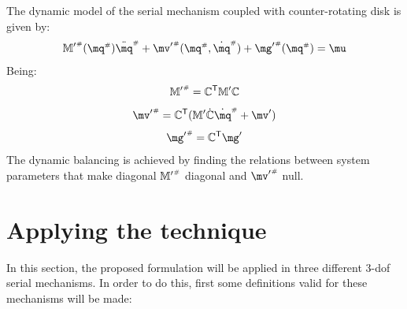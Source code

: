 \documentclass[a4paper,11pt,brazil,fleqn]{article}
\begin{document}
The dynamic model of the serial mechanism coupled with counter-rotating disk is given by:
\begin{equation}\label{eq:CoupledDynamics}
{\mM'}\ssh (\mq\ssh) \ddot{\mq}\ssh + {\mv'}\ssh(\mq\ssh,\dot{\mq}\ssh) + {\mg'}\ssh (\mq\ssh) = \mu
\end{equation}
Being:
\begin{equation}\label{eq:Mh'}
{\mathbb{M}'}^{\scriptscriptstyle \#} = \mathbb{C}^{\mathsf{T}} \mathbb{M}' \mathbb{C}
\end{equation}
\begin{equation}\label{eq:vh'}
{\mv'}\ssh = \mC^\msT ( \mM' \dot{\mC} \dot{\mq}\ssh + \mv')
\end{equation}
\begin{equation}\label{eq:gh'}
{\mg'}\ssh = \mC^\msT \mg'
\end{equation}
The dynamic balancing is achieved by finding the relations between system parameters that make diagonal ${\mathbb{M}'}^{\scriptscriptstyle \#}$ diagonal and ${\mv'}\ssh$ null.


 

\section{Applying the technique}\label{S03}

In this section, the proposed formulation will be applied in three different 3-dof serial mechanisms. In order to do this, first some definitions valid for these mechanisms will be made:
\end{document}
